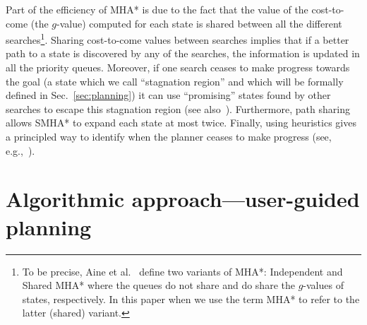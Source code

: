 \documentclass[conference]{IEEEtran}
\begin{document}
Part of the efficiency of MHA* is due to the fact that the value of the cost-to-come (the $g$-value) computed for each state is shared between all the different searches\footnote{To be precise, Aine et al.~\cite{ASNHL16} define two variants of MHA*: Independent and Shared MHA* where the queues do not share and do share the $g$-values of states, respectively. In this paper when we use the term MHA* to refer to the latter (shared) variant.}.
Sharing cost-to-come values between searches implies that if a better path to a state is discovered by any of the searches, the information is updated in all the
priority queues. 
Moreover, if one search ceases to make progress towards the goal (a state which we call ``stagnation region'' and which will be formally defined in Sec.~\ref{sec:planning}) it can use ``promising'' states found by other searches to escape this stagnation region (see also~\cite{HB12, I92}).
Furthermore, path sharing allows SMHA* to expand each state at most twice.
Finally, using heuristics gives a principled way to identify when the planner ceases to make progress (see, e.g.,~\cite{VNL17}).


%
%




\section{Algorithmic approach---user-guided planning}
\label{sec:high}
\end{document}
